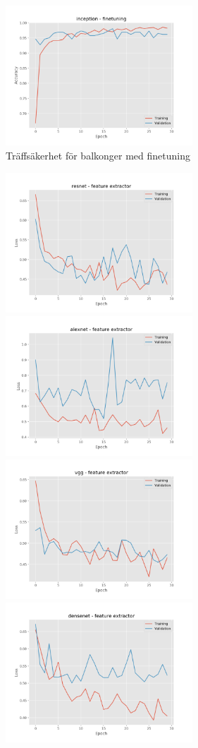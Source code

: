 \documentclass[]{kththesis}
\begin{document}
\begin{figure}[h]
    \includegraphics[width=7cm]{b_a_inception_fine}
    \caption{Träffsäkerhet för balkonger med finetuning}
    \label{fig:b_a_2}
  \end{figure}

  \begin{figure}[h]
    \includegraphics[width=7cm]{f_l_resnet_fe}
    \includegraphics[width=7cm]{f_l_alexnet_fe}
    \includegraphics[width=7cm]{f_l_vgg_fe}
    \includegraphics[width=7cm]{f_l_densenet_fe}

\end{figure}
\end{document}
